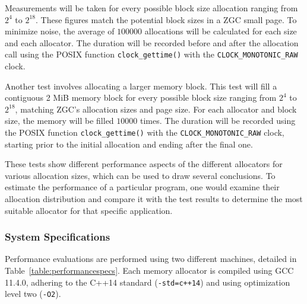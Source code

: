 Measurements will be taken for every possible block size allocation ranging from $2^4$ to $2^{18}$. These figures match the potential block sizes in a ZGC small page. To minimize noise, the average of $100 000$ allocations will be calculated for each size and each allocator. The duration will be recorded before and after the allocation call using the POSIX function \texttt{clock\_gettime()} with the \texttt{CLOCK\_MONOTONIC\_RAW} clock.

Another test involves allocating a larger memory block. This test will fill a contiguous 2 MiB memory block for every possible block size ranging from $2^4$ to $2^{18}$, matching ZGC's allocation sizes and page size. For each allocator and block size, the memory will be filled $10 000$ times. The duration will be recorded using the POSIX function \texttt{clock\_gettime()} with the \texttt{CLOCK\_MONOTONIC\_RAW} clock, starting prior to the initial allocation and ending after the final one.

These tests show different performance aspects of the different allocators for various allocation sizes, which can be used to draw several conclusions. To estimate the performance of a particular program, one would examine their allocation distribution and compare it with the test results to determine the most suitable allocator for that specific application.

\subsubsection{System Specifications}
Performance evaluations are performed using two different machines, detailed in Table~\ref{table:performancespecs}. Each memory allocator is compiled using GCC 11.4.0, adhering to the C++14 standard (\texttt{-std=c++14}) and using optimization level two (\texttt{-O2}).

